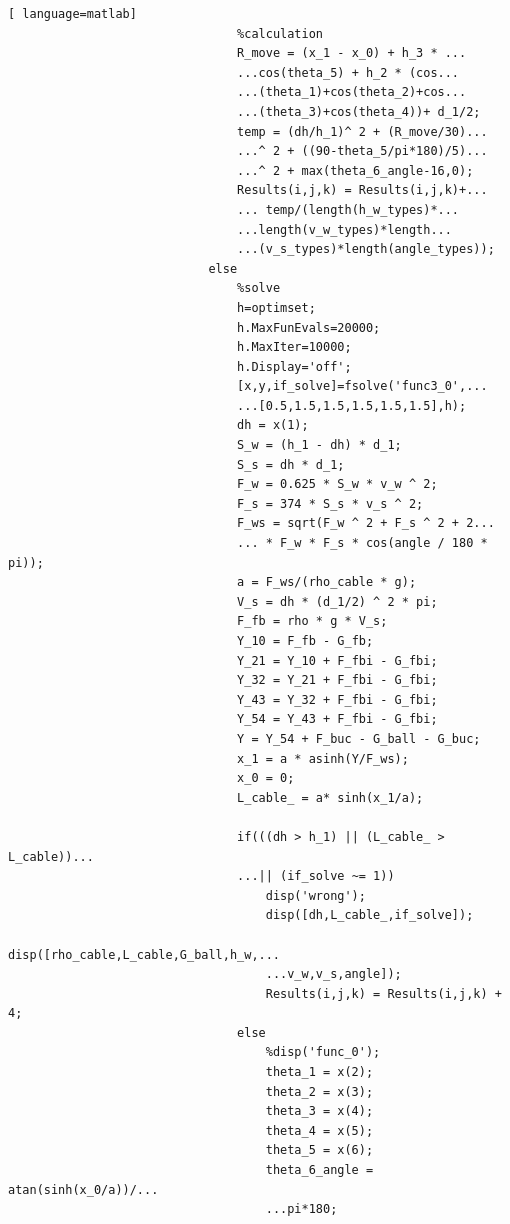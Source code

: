 \documentclass[a4paper,12pt]{ctexart}
\begin{document}
\begin{footnotesize}
\begin{lstlisting}[ language=matlab]
                                %calculation
                                R_move = (x_1 - x_0) + h_3 * ...
                                ...cos(theta_5) + h_2 * (cos...
                                ...(theta_1)+cos(theta_2)+cos...
                                ...(theta_3)+cos(theta_4))+ d_1/2;
                                temp = (dh/h_1)^ 2 + (R_move/30)...
                                ...^ 2 + ((90-theta_5/pi*180)/5)...
                                ...^ 2 + max(theta_6_angle-16,0);
                                Results(i,j,k) = Results(i,j,k)+...
                                ... temp/(length(h_w_types)*...
                                ...length(v_w_types)*length...
                                ...(v_s_types)*length(angle_types));
                            else
                                %solve
                                h=optimset;
                                h.MaxFunEvals=20000;
                                h.MaxIter=10000;
                                h.Display='off';
                                [x,y,if_solve]=fsolve('func3_0',...
                                ...[0.5,1.5,1.5,1.5,1.5,1.5],h);
                                dh = x(1);
                                S_w = (h_1 - dh) * d_1;
                                S_s = dh * d_1;
                                F_w = 0.625 * S_w * v_w ^ 2;
                                F_s = 374 * S_s * v_s ^ 2;
                                F_ws = sqrt(F_w ^ 2 + F_s ^ 2 + 2...
                                ... * F_w * F_s * cos(angle / 180 * pi));
                                a = F_ws/(rho_cable * g);
                                V_s = dh * (d_1/2) ^ 2 * pi;
                                F_fb = rho * g * V_s;
                                Y_10 = F_fb - G_fb;
                                Y_21 = Y_10 + F_fbi - G_fbi;
                                Y_32 = Y_21 + F_fbi - G_fbi;
                                Y_43 = Y_32 + F_fbi - G_fbi;
                                Y_54 = Y_43 + F_fbi - G_fbi;
                                Y = Y_54 + F_buc - G_ball - G_buc;
                                x_1 = a * asinh(Y/F_ws);
                                x_0 = 0;
                                L_cable_ = a* sinh(x_1/a);

                                if(((dh > h_1) || (L_cable_ > L_cable))...
                                ...|| (if_solve ~= 1))
                                    disp('wrong');
                                    disp([dh,L_cable_,if_solve]);
                                    disp([rho_cable,L_cable,G_ball,h_w,...
                                    ...v_w,v_s,angle]);
                                    Results(i,j,k) = Results(i,j,k) + 4;
                                else
                                    %disp('func_0');
                                    theta_1 = x(2);
                                    theta_2 = x(3);
                                    theta_3 = x(4);
                                    theta_4 = x(5);
                                    theta_5 = x(6);
                                    theta_6_angle = atan(sinh(x_0/a))/...
                                    ...pi*180;


\end{lstlisting}
\end{footnotesize}
\end{document}
